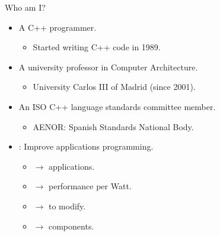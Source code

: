 \begin{frame}[t]{Who am I?}
\begin{itemize}
  \item A C++ programmer.
    \begin{itemize}
      \item Started writing C++ code in 1989.
    \end{itemize}
  \vfill\pause
  \item A university professor in Computer Architecture.
    \begin{itemize}
      \item University Carlos III of Madrid (since 2001).
    \end{itemize}
  \vfill\pause
  \item An ISO C++ language standards committee member.
    \begin{itemize}
      \item AENOR: Spanish Standards National Body.
    \end{itemize}
  \vfill\pause
  \item {}: Improve applications programming.
    \begin{itemize}
      \item {} $\rightarrow$  applications.
      \item {} $\rightarrow$  performance per Watt.
      \item {} $\rightarrow$  to modify.
      \item {} $\rightarrow$  components.
    \end{itemize}
\end{itemize}
\end{frame}
